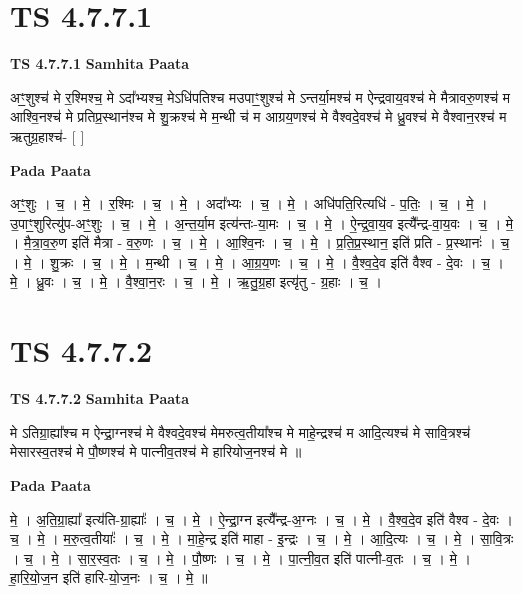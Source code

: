 \documentclass[17pt]{extarticle}
\begin{document}
\section*{ TS 4.7.7.1 }

\textbf{TS 4.7.7.1 } \newline
\textbf{Samhita Paata} \newline

अꣳ॒॒शुश्च॑ मे र॒श्मिश्च॒ मे ऽदा᳚भ्यश्च॒ मेऽधि॑पतिश्च मउपाꣳ॒॒शुश्च॑ मे ऽन्तर्या॒मश्च॑ म ऐन्द्रवाय॒वश्च॑ मे मैत्रावरु॒णश्च॑ म आश्वि॒नश्च॑ मे प्रतिप्र॒स्थान॑श्च मे शु॒क्रश्च॑ मे म॒न्थी च॑ म आग्रय॒णश्च॑ मे वैश्वदे॒वश्च॑ मे ध्रु॒वश्च॑ मे वैश्वान॒रश्च॑ म ऋतुग्र॒हाश्च॑- [  ] \newline

\textbf{Pada Paata} \newline

अꣳ॒॒शुः । च॒ । मे॒ । र॒श्मिः । च॒ । मे॒ । अदा᳚भ्यः । च॒ । मे॒ । अधि॑पति॒रित्यधि॑ - प॒तिः॒ । च॒ । मे॒ । उ॒पाꣳ॒॒शुरित्यु॑प-अꣳ॒॒शुः । च॒ । मे॒ । अ॒न्त॒र्या॒म इत्य॑न्तः-या॒मः । च॒ । मे॒ । ऐ॒न्द्र॒वा॒य॒व इत्यै᳚न्द्र-वा॒य॒वः । च॒ । मे॒ । मै॒त्रा॒व॒रु॒ण इति॑ मैत्रा - व॒रु॒णः । च॒ । मे॒ । आ॒श्वि॒नः । च॒ । मे॒ । प्र॒ति॒प्र॒स्थान॒ इति॑ प्रति - प्र॒स्थानः॑ । च॒ । मे॒ । शु॒क्रः । च॒ । मे॒ । म॒न्थी । च॒ । मे॒ । आ॒ग्र॒य॒णः । च॒ । मे॒ । वै॒श्व॒दे॒व इति॑ वैश्व - दे॒वः । च॒ । मे॒ । ध्रु॒वः । च॒ । मे॒ । वै॒श्वा॒न॒रः । च॒ । मे॒ । ऋ॒तु॒ग्र॒हा इत्यृ॑तु - ग्र॒हाः । च॒ ।  \newline




\section*{ TS 4.7.7.2 }

\textbf{TS 4.7.7.2 } \newline
\textbf{Samhita Paata} \newline

मे ऽतिग्रा॒ह्या᳚श्च म ऐन्द्रा॒ग्नश्च॑ मे वैश्वदे॒वश्च॑ मेमरुत्व॒तीया᳚श्च मे माहे॒न्द्रश्च॑ म आदि॒त्यश्च॑ मे सावि॒त्रश्च॑ मेसारस्व॒तश्च॑ मे पौ॒ष्णश्च॑ मे पात्नीव॒तश्च॑ मे हारियोज॒नश्च॑ मे ॥ \newline

\textbf{Pada Paata} \newline

मे॒ । अ॒ति॒ग्रा॒ह्या᳚ इत्य॑ति-ग्रा॒ह्याः᳚ । च॒ । मे॒ । ऐ॒न्द्रा॒ग्न इत्यै᳚न्द्र-अ॒ग्नः । च॒ । मे॒ । वै॒श्व॒दे॒व इति॑ वैश्व - दे॒वः । च॒ । मे॒ । म॒रु॒त्व॒तीयाः᳚ । च॒ । मे॒ । मा॒हे॒न्द्र इति॑ माहा - इ॒न्द्रः । च॒ । मे॒ । आ॒दि॒त्यः । च॒ । मे॒ । सा॒वि॒त्रः । च॒ । मे॒ । सा॒र॒स्व॒तः । च॒ । मे॒ । पौ॒ष्णः । च॒ । मे॒ । पा॒त्नी॒व॒त इति॑ पात्नी-व॒तः । च॒ । मे॒ । हा॒रि॒यो॒ज॒न इति॑ हारि-यो॒ज॒नः । च॒ । मे॒ ॥  \newline
\end{document}
